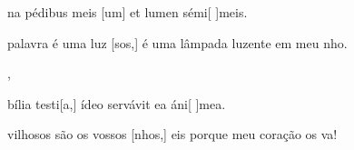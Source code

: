 {  {\item {}na pédibus meis [um] et lumen sémi[ ]{me}is.~\Antiphona}%
    {\item {} palavra é uma luz [sos,] é uma lâmpada luzente em meu nho.~\Antiphona},
  {\item {}bília testi[a,] ídeo servávit ea áni[ ]{me}a.~\Antiphona}%
    {\item {}vilhosos são os vossos [nhos,] eis porque meu coração os va!~\Antiphona}
}